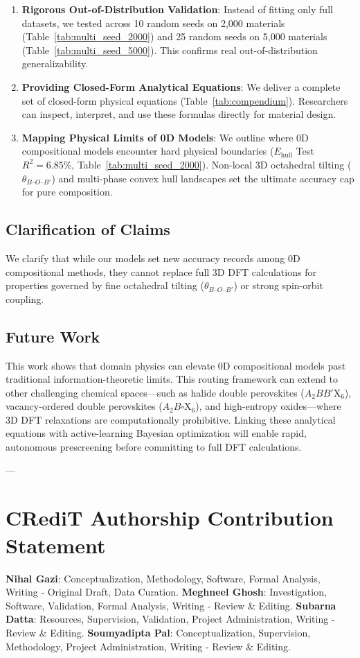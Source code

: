 \documentclass[12pt,onecolumn]{elsarticle}
\begin{document}
\begin{enumerate}
\item \textbf{Rigorous Out-of-Distribution Validation}: Instead of fitting only full datasets, we tested across 10 random seeds on 2,000 materials (Table~\ref{tab:multi_seed_2000}) and 25 random seeds on 5,000 materials (Table~\ref{tab:multi_seed_5000}). This confirms real out-of-distribution generalizability.

\item \textbf{Providing Closed-Form Analytical Equations}: We deliver a complete set of closed-form physical equations (Table~\ref{tab:compendium}). Researchers can inspect, interpret, and use these formulas directly for material design.

\item \textbf{Mapping Physical Limits of 0D Models}: We outline where 0D compositional models encounter hard physical boundaries ($E_{\text{hull}}$ Test $R^2 = 6.85\%$, Table~\ref{tab:multi_seed_2000}). Non-local 3D octahedral tilting ($\theta_{B\text{--}O\text{--}B'}$) and multi-phase convex hull landscapes set the ultimate accuracy cap for pure composition.
\end{enumerate}

\subsection{Clarification of Claims}
We clarify that while our models set new accuracy records among 0D compositional methods, they cannot replace full 3D DFT calculations for properties governed by fine octahedral tilting ($\theta_{B\text{--}O\text{--}B'}$) or strong spin-orbit coupling.

\subsection{Future Work}
This work shows that domain physics can elevate 0D compositional models past traditional information-theoretic limits. This routing framework can extend to other challenging chemical spaces—such as halide double perovskites ($A_2BB'\text{X}_6$), vacancy-ordered double perovskites ($A_2B\square\text{X}_6$), and high-entropy oxides—where 3D DFT relaxations are computationally prohibitive. Linking these analytical equations with active-learning Bayesian optimization will enable rapid, autonomous prescreening before committing to full DFT calculations.

---

\section*{CRediT Authorship Contribution Statement}
\textbf{Nihal Gazi}: Conceptualization, Methodology, Software, Formal Analysis, Writing - Original Draft, Data Curation. \textbf{Meghneel Ghosh}: Investigation, Software, Validation, Formal Analysis, Writing - Review \& Editing. \textbf{Subarna Datta}: Resources, Supervision, Validation, Project Administration, Writing - Review \& Editing. \textbf{Soumyadipta Pal}: Conceptualization, Supervision, Methodology, Project Administration, Writing - Review \& Editing.
\end{document}

